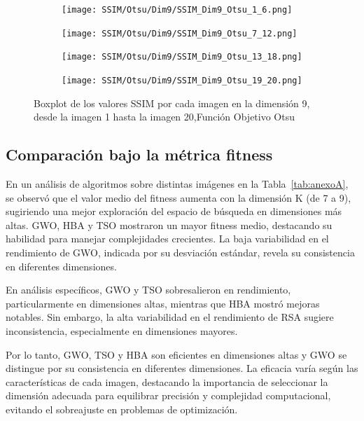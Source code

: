 \documentclass[conference]{IEEEtran}
\begin{document}
\begin{figure}
	\centering
	\begin{subfigure}{0.4\textwidth}
		\texttt{[image: SSIM/Otsu/Dim9/SSIM\_Dim9\_Otsu\_1\_6.png]}
	\end{subfigure}
	
	\begin{subfigure}{0.4\textwidth}
		\texttt{[image: SSIM/Otsu/Dim9/SSIM\_Dim9\_Otsu\_7\_12.png]}
	\end{subfigure}
	\begin{subfigure}{0.4\textwidth}
		\texttt{[image: SSIM/Otsu/Dim9/SSIM\_Dim9\_Otsu\_13\_18.png]}
	\end{subfigure}
	\begin{subfigure}{0.4\textwidth}
		\texttt{[image: SSIM/Otsu/Dim9/SSIM\_Dim9\_Otsu\_19\_20.png]}
		\vspace{-120pt} %
	\end{subfigure}
	\caption{Boxplot de los valores SSIM por cada imagen en la dimensión 9, desde la imagen 1 hasta la imagen 20,Función Objetivo Otsu}
	\label{fig:imagenes}    
\end{figure}

\subsection{Comparación bajo la métrica fitness}
\noindent En un análisis de algoritmos sobre distintas imágenes en la Tabla~\ref{tab:anexoA}, se observó que el valor medio del fitness aumenta con la dimensión K (de 7 a 9), sugiriendo una mejor exploración del espacio de búsqueda en dimensiones más altas. GWO, HBA y TSO mostraron un mayor fitness medio, destacando su habilidad para manejar complejidades crecientes. La baja variabilidad en el rendimiento de GWO, indicada por su desviación estándar, revela su consistencia en diferentes dimensiones.

\noindent En análisis específicos, GWO y TSO sobresalieron en rendimiento, particularmente en dimensiones altas, mientras que HBA mostró mejoras notables. Sin embargo, la alta variabilidad en el rendimiento de RSA sugiere inconsistencia, especialmente en dimensiones mayores.

\noindent Por lo tanto, GWO, TSO y HBA son eficientes en dimensiones altas y GWO se distingue por su consistencia en diferentes dimensiones. La eficacia varía según las características de cada imagen, destacando la importancia de seleccionar la dimensión adecuada para equilibrar precisión y complejidad computacional, evitando el sobreajuste en problemas de optimización.
\end{document}
